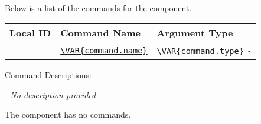  \\
\par Below is a list of the commands for the  component.

\begin{xltabular}{\textwidth}{ | c | l | X | }
  \hline
  \textbf{Local ID} & \textbf{Command Name} & \textbf{Argument Type} \\ \hline
  \texttt{} &
  \texttt{\url{\VAR{command.name}}} &
  \texttt{\url{\VAR{command.type}}}
  \texttt{-}
  \\ \hline
\end{xltabular}
\vspace{5mm} %

Command Descriptions:
\begin{spaceditemize}
  \item \textbf{\texttt{}} - 
    \textit{No description provided.}
\end{spaceditemize}
\vspace{5mm} %
\par The  component has no commands.
